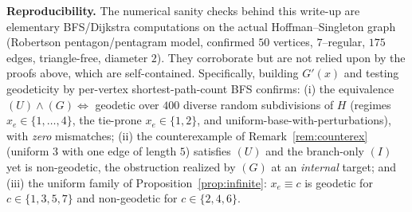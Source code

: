\documentclass{amsart}
\theoremstyle{definition}
\begin{document}
\noindent\textbf{Reproducibility.} The numerical sanity checks behind this
write-up are elementary BFS/Dijkstra computations on the actual Hoffman--Singleton
graph (Robertson pentagon/pentagram model, confirmed $50$ vertices, $7$--regular,
$175$ edges, triangle-free, diameter $2$). They corroborate but are not relied
upon by the proofs above, which are self-contained. Specifically, building $G'(x)$
and testing geodeticity by per-vertex shortest-path-count BFS confirms:
(i) the equivalence $(U)\wedge(G)\Leftrightarrow$ geodetic over $400$ diverse
random subdivisions of $H$ (regimes $x_e\in\{1,\dots,4\}$, the tie-prone
$x_e\in\{1,2\}$, and uniform-base-with-perturbations), with \emph{zero}
mismatches; (ii) the counterexample of Remark~\ref{rem:counterex} (uniform $3$
with one edge of length $5$) satisfies $(U)$ and the branch-only $(I)$ yet is
non-geodetic, the obstruction realized by $(G)$ at an \emph{internal} target;
and (iii) the uniform family of Proposition~\ref{prop:infinite}: $x_e\equiv c$ is
geodetic for $c\in\{1,3,5,7\}$ and non-geodetic for $c\in\{2,4,6\}$.
\end{document}
